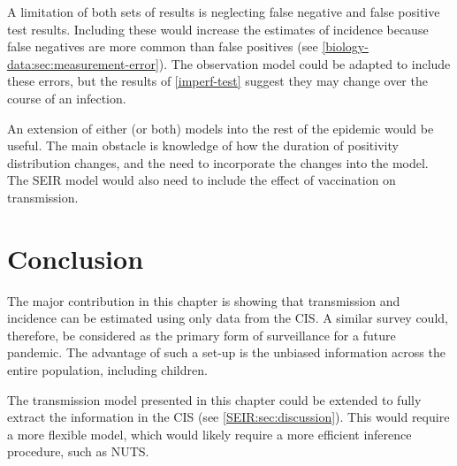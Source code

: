 \documentclass[thesis.tex]{subfiles}
\begin{document}
A limitation of both sets of results is neglecting false negative and false positive test results.
Including these would increase the estimates of incidence because false negatives are more common than false positives (see \cref{biology-data:sec:measurement-error}).
The observation model could be adapted to include these errors, but the results of \cref{imperf-test} suggest they may change over the course of an infection.

An extension of either (or both) models into the rest of the epidemic would be useful.
The main obstacle is knowledge of how the duration of positivity distribution changes, and the need to incorporate the changes into the model.
The SEIR model would also need to include the effect of vaccination on transmission.


\section{Conclusion}

The major contribution in this chapter is showing that transmission and incidence can be estimated using only data from the CIS.
A similar survey could, therefore, be considered as the primary form of surveillance for a future pandemic.
The advantage of such a set-up is the unbiased information across the entire population, including children.

The transmission model presented in this chapter could be extended to fully extract the information in the CIS (see \cref{SEIR:sec:discussion}).
This would require a more flexible model, which would likely require a more efficient inference procedure, such as NUTS.

\ifSubfilesClassLoaded{
  \appendix
  
  
  
  \listoftodos
}{}
\end{document}
